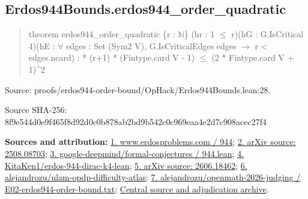 \documentclass[11pt,a4paper]{article}
\begin{document}
\begin{samepage}
\subsection{Erdos944Bounds.erdos944\_order\_quadratic}
\begin{quote}\small\ttfamily theorem erdos944\_order\_quadratic \{r : \ensuremath{\mathbb{N}}\} (hr : 1 \ensuremath{\leq} r)\newline     (hG : G.IsCritical 4)\newline     (hE : \ensuremath{\forall} edges : Set (Sym2 V), G.IsCriticalEdges edges \ensuremath{\to} r < edges.ncard) : * (r+1) * (Fintype.card V - 1) \ensuremath{\leq} (2 * Fintype.card V + 1)\textasciicircum{}2\end{quote}
{\small Source: proofs/erdos944-order-bound/OpHack/Erdos944Bounds.lean:28.\par}

{\small Source SHA-256: 8f9e544d0e9f465f8d92d0c0b878ab2bd9b542c0c969eaa4e2d7c908acec27f4\par}

{\small\textbf{Sources and attribution:} \href{https://www.erdosproblems.com/944}{1. www.erdosproblems.com / 944}; \href{https://arxiv.org/html/2508.08703}{2. arXiv source: 2508.08703}; \href{https://github.com/google-deepmind/formal-conjectures/blob/main/FormalConjectures/ErdosProblems/944.lean}{3. google-deepmind/formal-conjectures / 944.lean}; \href{https://github.com/KitaKen1/erdos-944-dirac-k4-lean}{4. KitaKen1/erdos-944-dirac-k4-lean}; \href{https://arxiv.org/abs/2606.18462}{5. arXiv source: 2606.18462}; \href{https://github.com/alejandrozu/ulam-opdp-difficulty-atlas}{6. alejandrozu/ulam-opdp-difficulty-atlas}; \href{https://github.com/alejandrozu/openmath-2026-judging/blob/d0ed487f487fa7ec814ff705ab55249983fe8707/OpenMath-Judging/review/entries/E02-erdos944-order-bound.txt}{7. alejandrozu/openmath-2026-judging / E02-erdos944-order-bound.txt}; \href{https://github.com/alejandrozu/openmath-2026-judging}{Central source and adjudication archive}.\par}

\end{samepage}
\end{document}
